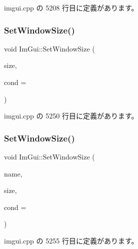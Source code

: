  imgui.\+cpp の 5208 行目に定義があります。

\mbox{\label{namespace_im_gui_a657c6cc2246485332f608a5204447ea1}} 
\subsubsection{\texorpdfstring{Set\+Window\+Size()}{SetWindowSize()}\hspace{0.1cm}{\footnotesize\ttfamily [1/2]}}
{\footnotesize\ttfamily void Im\+Gui\+::\+Set\+Window\+Size (\begin{DoxyParamCaption}\item[{const \mbox{\hyperlink{struct_im_vec2}{Im\+Vec2}} \&}]{size,  }\item[{\mbox{\hyperlink{imgui_8h_aef890d6ac872e12c5804d0b3e4f7f103}{Im\+Gui\+Cond}}}]{cond = {} }\end{DoxyParamCaption})}



 imgui.\+cpp の 5250 行目に定義があります。

\mbox{\label{namespace_im_gui_a441528b9198d4531e79337121212cd33}} 
\subsubsection{\texorpdfstring{Set\+Window\+Size()}{SetWindowSize()}\hspace{0.1cm}{\footnotesize\ttfamily [2/2]}}
{\footnotesize\ttfamily void Im\+Gui\+::\+Set\+Window\+Size (\begin{DoxyParamCaption}\item[{const char $\ast$}]{name,  }\item[{const \mbox{\hyperlink{struct_im_vec2}{Im\+Vec2}} \&}]{size,  }\item[{\mbox{\hyperlink{imgui_8h_aef890d6ac872e12c5804d0b3e4f7f103}{Im\+Gui\+Cond}}}]{cond = {} }\end{DoxyParamCaption})}



 imgui.\+cpp の 5255 行目に定義があります。

\mbox{\label{namespace_im_gui_a73b4d230c8fffd2a07d799cd9d4e2a03}} 
